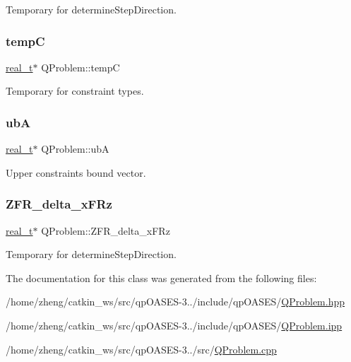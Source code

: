 Temporary for determine\+Step\+Direction. \mbox{\label{class_q_problem_a1ae0a9468a7b21ccbb67362d7c000c41}} 
\subsubsection{\texorpdfstring{tempC}{tempC}}
{\footnotesize\ttfamily \hyperlink{qp_o_a_s_e_s__wrapper_8h_a0d00e2b3dfadee81331bbb39068570c4}{real\+\_\+t}$\ast$ Q\+Problem\+::tempC\hspace{0.3cm}{\ttfamily [protected]}}

Temporary for constraint types. \mbox{\label{class_q_problem_afbb3ece123fd25bb93e9546557cc1b5d}} 
\subsubsection{\texorpdfstring{ubA}{ubA}}
{\footnotesize\ttfamily \hyperlink{qp_o_a_s_e_s__wrapper_8h_a0d00e2b3dfadee81331bbb39068570c4}{real\+\_\+t}$\ast$ Q\+Problem\+::ubA\hspace{0.3cm}{\ttfamily [protected]}}

Upper constraints\textquotesingle{} bound vector. \mbox{\label{class_q_problem_a70a3a688b2ac0d3f5c51ea1112ffe6e2}} 
\subsubsection{\texorpdfstring{Z\+F\+R\+\_\+delta\+\_\+x\+F\+Rz}{ZFR\_delta\_xFRz}}
{\footnotesize\ttfamily \hyperlink{qp_o_a_s_e_s__wrapper_8h_a0d00e2b3dfadee81331bbb39068570c4}{real\+\_\+t}$\ast$ Q\+Problem\+::\+Z\+F\+R\+\_\+delta\+\_\+x\+F\+Rz\hspace{0.3cm}{\ttfamily [protected]}}

Temporary for determine\+Step\+Direction. 

The documentation for this class was generated from the following files\+:\begin{DoxyCompactItemize}
\item 
/home/zheng/catkin\+\_\+ws/src/qp\+O\+A\+S\+E\+S-\/3../include/qp\+O\+A\+S\+E\+S/\hyperlink{_q_problem_8hpp}{Q\+Problem.\+hpp}\item 
/home/zheng/catkin\+\_\+ws/src/qp\+O\+A\+S\+E\+S-\/3../include/qp\+O\+A\+S\+E\+S/\hyperlink{_q_problem_8ipp}{Q\+Problem.\+ipp}\item 
/home/zheng/catkin\+\_\+ws/src/qp\+O\+A\+S\+E\+S-\/3../src/\hyperlink{_q_problem_8cpp}{Q\+Problem.\+cpp}\end{DoxyCompactItemize}
